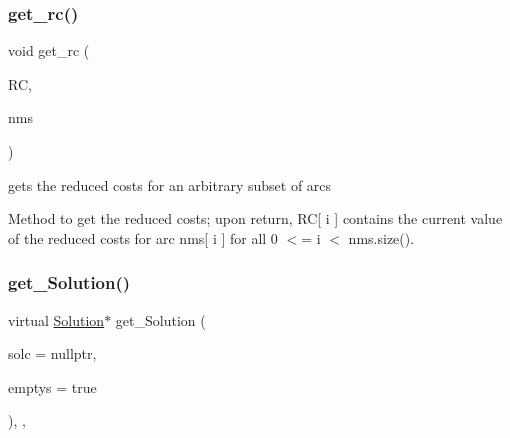 \subsubsection{\texorpdfstring{get\+\_\+rc()}{get\_rc()}\hspace{0.1cm}{\footnotesize\ttfamily [2/2]}}
{\footnotesize\ttfamily void get\+\_\+rc (\begin{DoxyParamCaption}\item[{\mbox{\hyperlink{class_s_m_spp__di__unipi__it_1_1_m_c_f_block_a9a7c9495f1f1feab22f3c556b70f60f0}{Vec\+\_\+\+C\+Number}} \&}]{RC,  }\item[{\mbox{\hyperlink{class_s_m_spp__di__unipi__it_1_1_m_c_f_block_a03461123d4f6090aefeb97ef653d3f2b}{c\+\_\+\+Vec\+\_\+\+Index}} \&}]{nms }\end{DoxyParamCaption})}



gets the reduced costs for an arbitrary subset of arcs 

Method to get the reduced costs; upon return, RC\mbox{[} i \mbox{]} contains the current value of the reduced costs for arc nms\mbox{[} i \mbox{]} for all 0 $<$= i $<$ nms.\+size(). \mbox{\label{class_s_m_spp__di__unipi__it_1_1_m_c_f_block_a55335e0e301e1bfa9592e8532bfd61e7}} 
\subsubsection{\texorpdfstring{get\+\_\+\+Solution()}{get\_Solution()}}
{\footnotesize\ttfamily virtual \mbox{\hyperlink{class_s_m_spp__di__unipi__it_1_1_solution}{Solution}}$\ast$ get\+\_\+\+Solution (\begin{DoxyParamCaption}\item[{\mbox{\hyperlink{class_s_m_spp__di__unipi__it_1_1_configuration}{Configuration}} $\ast$}]{solc = {\ttfamily nullptr},  }\item[{bool}]{emptys = {\ttfamily true} }\end{DoxyParamCaption})\hspace{0.3cm}{\ttfamily [final]}, {\ttfamily [override]}, {\ttfamily [virtual]}}



